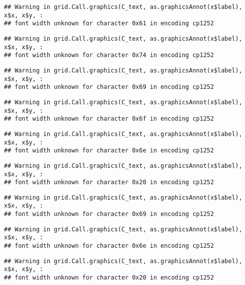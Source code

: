 \documentclass[
]{article}
\begin{document}
\begin{verbatim}
## Warning in grid.Call.graphics(C_text, as.graphicsAnnot(x$label), x$x, x$y, :
## font width unknown for character 0x61 in encoding cp1252
\end{verbatim}

\begin{verbatim}
## Warning in grid.Call.graphics(C_text, as.graphicsAnnot(x$label), x$x, x$y, :
## font width unknown for character 0x74 in encoding cp1252
\end{verbatim}

\begin{verbatim}
## Warning in grid.Call.graphics(C_text, as.graphicsAnnot(x$label), x$x, x$y, :
## font width unknown for character 0x69 in encoding cp1252
\end{verbatim}

\begin{verbatim}
## Warning in grid.Call.graphics(C_text, as.graphicsAnnot(x$label), x$x, x$y, :
## font width unknown for character 0x6f in encoding cp1252
\end{verbatim}

\begin{verbatim}
## Warning in grid.Call.graphics(C_text, as.graphicsAnnot(x$label), x$x, x$y, :
## font width unknown for character 0x6e in encoding cp1252
\end{verbatim}

\begin{verbatim}
## Warning in grid.Call.graphics(C_text, as.graphicsAnnot(x$label), x$x, x$y, :
## font width unknown for character 0x20 in encoding cp1252
\end{verbatim}

\begin{verbatim}
## Warning in grid.Call.graphics(C_text, as.graphicsAnnot(x$label), x$x, x$y, :
## font width unknown for character 0x69 in encoding cp1252
\end{verbatim}

\begin{verbatim}
## Warning in grid.Call.graphics(C_text, as.graphicsAnnot(x$label), x$x, x$y, :
## font width unknown for character 0x6e in encoding cp1252
\end{verbatim}

\begin{verbatim}
## Warning in grid.Call.graphics(C_text, as.graphicsAnnot(x$label), x$x, x$y, :
## font width unknown for character 0x20 in encoding cp1252
\end{verbatim}
\end{document}
